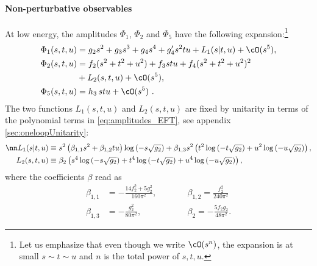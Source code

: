 \paragraph{Non-perturbative observables}
At low energy, the amplitudes $\Phi_1$, $\Phi_2$ and $\Phi_5$ have the following expansion:\footnote{Let us emphasize  that even though we write $\cO(s^n)$,  the expansion is  at small $s\sim t \sim u$ and $n$ is the total power of $s,t,u$. }
\begin{equation}
	\label{eq:amplitudes_EFT}
	\begin{aligned}
		\Phi_1(s,t,u) &= g_2 s^2 + g_3 s^3 + g_4 s^4+ g_4^\prime  s^2 t u + L_1( s| t, u) +\cO( s^5) , \\
		\Phi_2(s,t,u)  &=f_2 (s^2+ t^2 + u^2)+f_3 s t u + f_4(s^2+t^2+u^2)^2 \\
		&+ L_2(s,t,u)+\cO(s^5), \\
		\Phi_5(s,t,u)  &= h_3 \, s t u+\cO(s^5)~.
	\end{aligned}
\end{equation}
The two functions $L_1(s,t,u)$ and $L_2(s,t,u)$ are fixed by unitarity in terms of the polynomial terms in \eqref{eq:amplitudes_EFT}, see appendix \ref{sec:oneloopUnitarity}:
\begin{align}
	\nn
	L_1(s|t,u) &\equiv  s^2\left(\beta_{1,1}s^2+\beta_{1,2} t u\right)\log\left(- s \sqrt{g_2}\right) +\beta_{1,3}s^2\left( t^2\log\left(- t \sqrt{g_2}\right)+ u^2\log\left(-u\sqrt{g_2}\right)\right),\\
	L_2(s,t,u) &\equiv \beta_2\left(s^4 \log\left(-s \sqrt{g_2}\right) + t^4\log\left(-t \sqrt{g_2}\right) + u^4\log\left(-u \sqrt{g_2}\right) \right),
	\label{eq:loops}
\end{align}
where the coefficients $\beta$ read as
\begin{equation}
\label{betaEFT}
	\begin{aligned}
		\beta_{1,1}&= - \frac{14f_2^2+5g_2^2}{160\pi^2},\qquad
		&&\beta_{1,2}= \frac{f_2^2}{240\pi^2}\\
		\beta_{1,3}&= - \frac{g_2^2}{80\pi^2},\qquad
		&&\beta_{2}= - \frac{5f_2 g_2}{48 \pi^2}.
	\end{aligned}
\end{equation}


